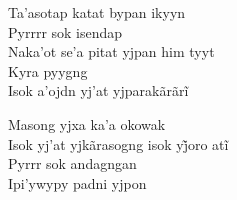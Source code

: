 \bigskip

\begin{linenumbers}
 
\noindent   Ta'asotap katat bypan ikyyn\\
  Pyrrrr sok isendap\\
  Naka'ot se'a pitat yjpan him tyyt\\
  Kyra pyygng\\
  Isok a’ojdn yj’at yjparakãrãrĩ
 
\end{linenumbers}

\bigskip

\begin{linenumbers}
 
\noindent   Masong yjxa ka'a okowak\\
  Isok yj’at yjkãrasogng isok yj̃oro atĩ\\
  Pyrrr sok andagngan\\
  Ipi'ywypy padni yjpon
 
\end{linenumbers}

\bigskip

